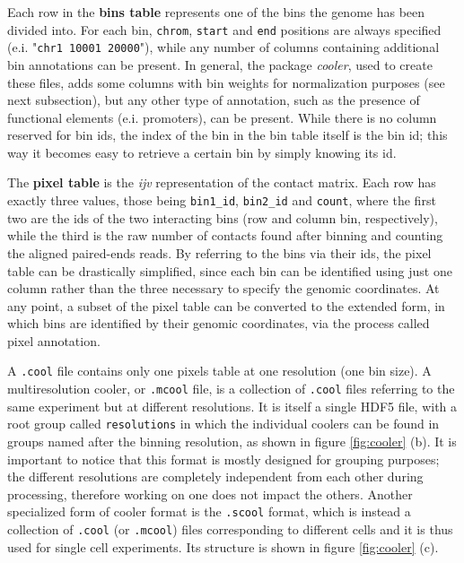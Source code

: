 Each row in the \textbf{bins table} represents one of the bins the genome has been divided into. For each bin, \texttt{chrom}, \texttt{start} and \texttt{end} positions are always specified (e.i. "\texttt{chr1  10001  20000}"), while any number of columns containing additional bin annotations can be present. In general, the package \emph{cooler}, used to create these files, adds some columns with bin weights for normalization purposes (see next subsection), but any other type of annotation, such as the presence of functional elements (e.i. promoters), can be present. While there is no column reserved for bin ids, the index of the bin in the bin table itself is the bin id; this way it becomes easy to retrieve a certain bin by simply knowing its id.

The \textbf{pixel table} is the \emph{ijv} representation of the contact matrix. Each row has exactly three values, those being \texttt{bin1\_id}, \texttt{bin2\_id} and \texttt{count}, where the first two are the ids of the two interacting bins (row and column bin, respectively), while the third is the raw number of contacts found after binning and counting the aligned paired-ends reads. By referring to the bins via their ids, the pixel table can be drastically simplified, since each bin can be identified using just one column rather than the three necessary to specify the genomic coordinates. At any point, a subset of the pixel table can be converted to the extended form, in which bins are identified by their genomic coordinates, via the process called pixel annotation.

A \texttt{.cool} file contains only one pixels table at one resolution (one bin size). A multiresolution cooler, or \texttt{.mcool} file, is a collection of \texttt{.cool} files referring to the same experiment but at different resolutions. It is itself a single HDF5 file, with a root group called \texttt{resolutions} in which the individual coolers can be found in groups named after the binning resolution, as shown in figure \ref{fig:cooler} (b). It is important to notice that this format is mostly designed for grouping purposes; the different resolutions are completely independent from each other during processing, therefore working on one does not impact the others. Another specialized form of cooler format is the \texttt{.scool} format, which is instead a collection of \texttt{.cool} (or \texttt{.mcool}) files corresponding to different cells and it is thus used for single cell experiments. Its structure is shown in figure \ref{fig:cooler} (c).

